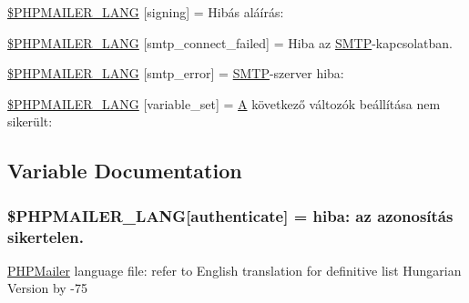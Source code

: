 \begin{DoxyCompactItemize}
\item 
\hyperlink{phpmailer_8lang-hu_8php_a68e437bdb9b968a5a67320f03d231565}{\$\+P\+H\+P\+M\+A\+I\+L\+E\+R\+\_\+\+L\+A\+NG} \mbox{[}\textquotesingle{}signing\textquotesingle{}\mbox{]} = \textquotesingle{}Hibás aláírás\+: \textquotesingle{}
\item 
\hyperlink{phpmailer_8lang-hu_8php_a7b321d4ca1e9df702403ed4c61aa0980}{\$\+P\+H\+P\+M\+A\+I\+L\+E\+R\+\_\+\+L\+A\+NG} \mbox{[}\textquotesingle{}smtp\+\_\+connect\+\_\+failed\textquotesingle{}\mbox{]} = \textquotesingle{}Hiba az \hyperlink{class_s_m_t_p}{S\+M\+TP}-\/kapcsolatban.\textquotesingle{}
\item 
\hyperlink{phpmailer_8lang-hu_8php_a7d9cffba1e669c845f8a4c891ee50064}{\$\+P\+H\+P\+M\+A\+I\+L\+E\+R\+\_\+\+L\+A\+NG} \mbox{[}\textquotesingle{}smtp\+\_\+error\textquotesingle{}\mbox{]} = \textquotesingle{}\hyperlink{class_s_m_t_p}{S\+M\+TP}-\/szerver hiba\+: \textquotesingle{}
\item 
\hyperlink{phpmailer_8lang-hu_8php_af795debc7a739d038742691c358d9032}{\$\+P\+H\+P\+M\+A\+I\+L\+E\+R\+\_\+\+L\+A\+NG} \mbox{[}\textquotesingle{}variable\+\_\+set\textquotesingle{}\mbox{]} = \textquotesingle{}\hyperlink{_chart_8min_8js_a9757042cb6157b0f84e78a5ff4aa6f93}{A} következő változók beállítása nem sikerült\+: \textquotesingle{}
\end{DoxyCompactItemize}


\subsection{Variable Documentation}
\subsubsection[{\texorpdfstring{\$\+P\+H\+P\+M\+A\+I\+L\+E\+R\+\_\+\+L\+A\+NG}{$PHPMAILER_LANG}}]{\setlength{\rightskip}{0pt plus 5cm}\$P\+H\+P\+M\+A\+I\+L\+E\+R\+\_\+\+L\+A\+NG\mbox{[}\textquotesingle{}authenticate\textquotesingle{}\mbox{]} =  hiba\+: az azonosítás sikertelen.\textquotesingle{}}\hypertarget{phpmailer_8lang-hu_8php_a2cb33073c989b85580748e331ed8b4aa}{}\label{phpmailer_8lang-hu_8php_a2cb33073c989b85580748e331ed8b4aa}
\hyperlink{class_p_h_p_mailer}{P\+H\+P\+Mailer} language file\+: refer to English translation for definitive list Hungarian Version by -\/75 


